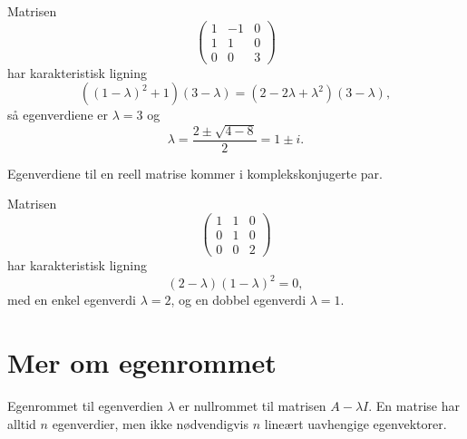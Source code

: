 \begin{ex}
Matrisen
\[
\begin{pmatrix}
1 & -1 & 0\\ 1 &1 &0 \\ 0 & 0 & 3
\end{pmatrix}
\]
har karakteristisk ligning
\[
((1-\lambda)^2+1)(3-\lambda)=(2-2\lambda+\lambda^2)(3-\lambda),
\]
så egenverdiene er $\lambda=3$ og
\[
\lambda=\frac{2\pm\sqrt{4-8}}{2}=1\pm i.
\] 
\end{ex}

\begin{thm}
Egenverdiene til en reell matrise kommer i komplekskonjugerte par.
\end{thm}


\begin{ex}
Matrisen
\[
\begin{pmatrix}
1 & 1 & 0\\  0 &1 & 0 \\ 0 & 0 & 2
\end{pmatrix}
\]
har karakteristisk ligning
\[
(2-\lambda)(1-\lambda)^2=0,
\]
med en enkel egenverdi $\lambda=2$, og en dobbel egenverdi $\lambda=1$. 
\end{ex}


\section*{Mer om egenrommet}
Egenrommet til egenverdien $\lambda$ er nullrommet til matrisen $A-\lambda I$.
En matrise har alltid $n$ egenverdier, 
men ikke nødvendigvis $n$ lineært uavhengige egenvektorer.

